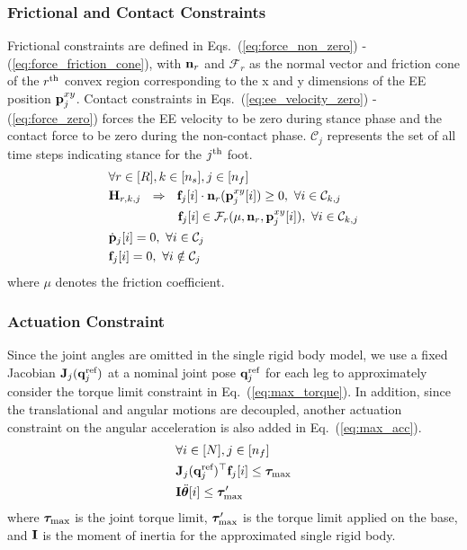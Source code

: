 \subsubsection{Frictional and Contact Constraints}
Frictional constraints are defined in Eqs.~(\ref{eq:force_non_zero}) - (\ref{eq:force_friction_cone}), with $\mathbf{n}_r$ and $\mathcal{F}_r$ as the normal vector and friction cone of the $r^{\rm th}$ convex region corresponding to the x and y dimensions of the EE position $\mathbf{p}^{xy}_j$. Contact constraints in Eqs.~(\ref{eq:ee_velocity_zero}) - (\ref{eq:force_zero}) forces the EE velocity to be zero during stance phase and the contact force to be zero during the non-contact phase. $\mathcal{C}_{j}$ represents the set of all time steps indicating stance for the $j^{\rm th}$ foot.
\begin{align}
    \nonumber &\forall r \in [R], k \in [n_s], j \in [n_f]\\\label{eq:force_non_zero}
    &\mathbf{H}_{r,k,j} \ \  \Rightarrow \ \ \mathbf{f}_j[i] \cdot \mathbf{n}_r(\mathbf{p}_j^{xy}[i]) \ge 0, \ \forall i \in \mathcal{C}_{k,j}\\
    \label{eq:force_friction_cone}
        & \hspace{1.95cm} \mathbf{f}_j[i] \in \mathcal{F}_r(\mu, \mathbf{n}_r, \mathbf{p}_j^{xy}[i]), \ \forall i \in \mathcal{C}_{k,j}
         \\\label{eq:ee_velocity_zero}
            &\dot{\mathbf{p}}_j[i]=0, \ \forall i \in \mathcal{C}_j
        \\\label{eq:force_zero}
         &\mathbf{f}_j[i] = 0, \ \forall i \notin \mathcal{C}_j
\end{align}
%
where $\mu$ denotes the friction coefficient.

\subsubsection{Actuation Constraint}
Since the joint angles are omitted in the single rigid body model, we use a fixed Jacobian $\mathbf{J}_j(\mathbf{q}_j^{\text{ref}})$ at a nominal joint pose $\mathbf{q}_j^{\text{ref}}$ for each leg to approximately consider the torque limit constraint in Eq.~(\ref{eq:max_torque}). In addition, since the translational and angular motions are decoupled, another actuation constraint on the angular acceleration is also added in Eq.~(\ref{eq:max_acc}).
\begin{align}
\nonumber & \forall i \in [N], j \in [n_f] \\
    \label{eq:max_torque}
& \mathbf{J}_j(\mathbf{q}_j^{\text{ref}})^{\top} \mathbf{f}_j[i] \leq \bm{\tau}_{\rm max}\\\label{eq:max_acc}
& \mathbf{I} \ddot{\bm{\theta}}[i] \leq \bm{\tau}_{\rm max}^{\prime}
\end{align}
where $\bm{\tau}_{\rm max}$ is the joint torque limit, $\bm{\tau}_{\rm max}^{\prime}$ is the torque limit applied on the base, and $\mathbf{I}$ is the moment of inertia for the approximated single rigid body.

